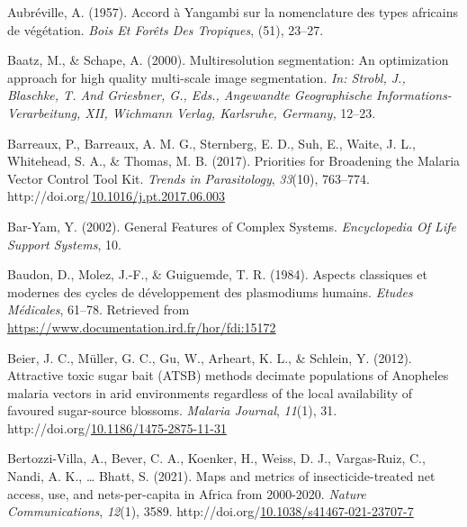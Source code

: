 \documentclass[12pt,twoside]{reedthesis}
\newlength{\cslhangindent}
\newenvironment{CSLReferences}[2] %
 {%
  \setlength{\parindent}{0pt}
  \ifodd #1 \everypar{\setlength{\hangindent}{\cslhangindent}}\ignorespaces\fi
  \ifnum #2 > 0
  \setlength{\parskip}{#2\baselineskip}
  \fi
 }%
 {}
\begin{document}
\begin{CSLReferences}{1}{0}
\leavevmode{}%
Aubréville, A. (1957). Accord à {Yangambi} sur la nomenclature des types africains de végétation. \emph{Bois Et Forêts Des Tropiques}, (51), 23--27.

\leavevmode{}%
Baatz, M., \& Schape, A. (2000). Multiresolution segmentation: An optimization approach for high quality multi-scale image segmentation. \emph{In: Strobl, J., Blaschke, T. And Griesbner, G., Eds., Angewandte Geographische Informations-Verarbeitung, XII, Wichmann Verlag, Karlsruhe, Germany,} 12--23.

\leavevmode{}%
Barreaux, P., Barreaux, A. M. G., Sternberg, E. D., Suh, E., Waite, J. L., Whitehead, S. A., \& Thomas, M. B. (2017). Priorities for {Broadening} the {Malaria} {Vector} {Control} {Tool} {Kit}. \emph{Trends in Parasitology}, \emph{33}(10), 763--774. http://doi.org/\href{https://doi.org/10.1016/j.pt.2017.06.003}{10.1016/j.pt.2017.06.003}

\leavevmode{}%
Bar-Yam, Y. (2002). General {Features} of {Complex} {Systems}. \emph{Encyclopedia Of Life Support Systems}, 10.

\leavevmode{}%
Baudon, D., Molez, J.-F., \& Guiguemde, T. R. (1984). {A}spects classiques et modernes des cycles de d{é}veloppement des plasmodiums humains. \emph{{E}tudes {M}{é}dicales}, 61--78. Retrieved from \url{https://www.documentation.ird.fr/hor/fdi:15172}

\leavevmode{}%
Beier, J. C., Müller, G. C., Gu, W., Arheart, K. L., \& Schlein, Y. (2012). Attractive toxic sugar bait ({ATSB}) methods decimate populations of {Anopheles} malaria vectors in arid environments regardless of the local availability of favoured sugar-source blossoms. \emph{Malaria Journal}, \emph{11}(1), 31. http://doi.org/\href{https://doi.org/10.1186/1475-2875-11-31}{10.1186/1475-2875-11-31}

\leavevmode{}%
Bertozzi-Villa, A., Bever, C. A., Koenker, H., Weiss, D. J., Vargas-Ruiz, C., Nandi, A. K., \ldots{} Bhatt, S. (2021). Maps and metrics of insecticide-treated net access, use, and nets-per-capita in {Africa} from 2000-2020. \emph{Nature Communications}, \emph{12}(1), 3589. http://doi.org/\href{https://doi.org/10.1038/s41467-021-23707-7}{10.1038/s41467-021-23707-7}


\end{CSLReferences}
\end{document}

